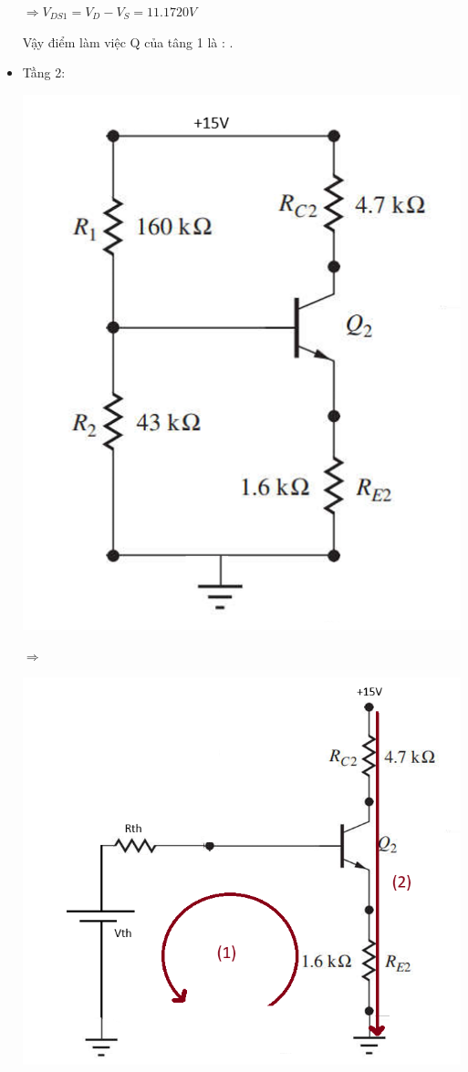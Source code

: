 \begin{itemize}[label=-]
		$ \Rightarrow V_{DS1} = V_{D} - V_{S} = 11.1720V $
		
		Vậy điểm làm việc Q của tâng 1 là : .
		
		\item Tầng 2:
		
		\begin{minipage}{0.4\linewidth}
			\includegraphics[width=.7\linewidth]{./my-chapters/my-images/Question6/DC_tang2.png}
		\end{minipage}
		\begin{minipage}{0.1\linewidth}
			$\Rightarrow$
		\end{minipage}
		\begin{minipage}{0.4\linewidth}
			\includegraphics[width=.8\linewidth]{./my-chapters/my-images/Question6/DC_tang2 - Copy.png}
		\end{minipage}
		

\end{itemize}
